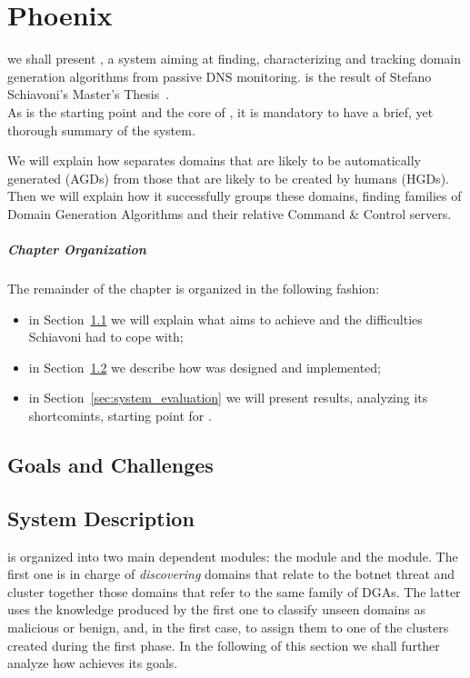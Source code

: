 
\chapter{Phoenix} %
\label{chap:phoenix}

 we shall present \phoenix, a system aiming at finding,
characterizing and tracking domain generation algorithms from passive DNS
monitoring. \phoenix is the result of Stefano Schiavoni's Master's
Thesis~\cite{schiavoni2013}. \\
As \phoenix is the starting point and the core of \thesystem, it is mandatory
to have a brief, yet thorough summary of the system.

We will explain how \phoenix separates domains that are likely to be
automatically generated (AGDs) from those that are likely to be created by
humans (HGDs). Then we will explain how it successfully groups these domains,
finding families of Domain Generation Algorithms and their relative Command
\& Control servers.

\paragraph{Chapter Organization} The remainder of the chapter is organized in
the following fashion:
\begin{itemize}
    \item in Section~\ref{sec:goals_and_challenges} we will explain what \phoenix
        aims to achieve and the difficulties Schiavoni had to cope with;
    \item in Section~\ref{sec:system_description} we describe how \phoenix was
        designed and implemented;
    \item in Section~\ref{sec:system_evaluation} we will present \phoenix results,
        analyzing its shortcomints, starting point for \thesystem.
\end{itemize}

\section{Goals and Challenges} %
\label{sec:goals_and_challenges}


\section{System Description} %
\label{sec:system_description}
 is organized into two main dependent modules: the
 module and the  module. The first
one is in charge of \emph{discovering} domains that relate to the botnet threat
and cluster together those domains that refer to the same family of DGAs. The latter
uses the knowledge produced by the first one to classify unseen domains as malicious or benign, and, in the first case, to assign them to one of the clusters created
during the first phase. In the following of this section we shall further analyze how \phoenix
achieves its goals.

